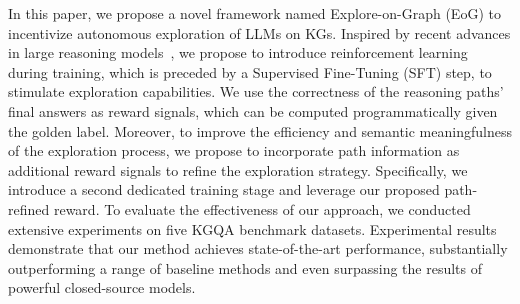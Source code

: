 In this paper, we propose a novel framework named Explore-on-Graph (EoG) to incentivize autonomous exploration of LLMs on KGs.
Inspired by recent advances in large reasoning models~\citep{guo2025deepseek}, we propose to introduce reinforcement learning during training, which is preceded by a Supervised Fine-Tuning (SFT) step, to stimulate exploration capabilities.
We use the correctness of the reasoning paths' final answers as reward signals, which can be computed programmatically given the golden label.
Moreover, to improve the efficiency and semantic meaningfulness of the exploration process, we propose to incorporate path information as additional reward signals to refine the exploration strategy.
Specifically, we introduce a second dedicated training stage and leverage our proposed path-refined reward.
To evaluate the effectiveness of our approach, we conducted extensive experiments on five KGQA benchmark datasets. 
Experimental results demonstrate that our method achieves state-of-the-art performance, substantially outperforming a range of baseline methods and even surpassing the results of powerful closed-source models.


